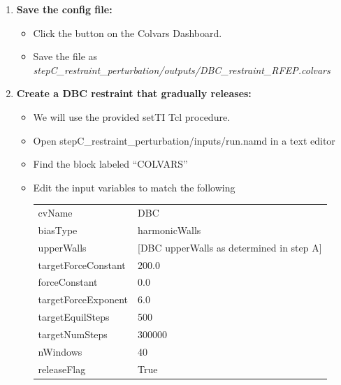 \documentclass[9pt,tutorial,pubversion]{Styling/livecoms}
\newcommand{\filepath}[1]{\textit{#1}}
\newcommand{\button}[1]{\inlineBox[gray]{\texttt{#1}}}
\begin{document}
\begin{enumerate}
\begin{enumerate}[label=\alph*., ref=\theenumi.\alph*]
            \item \textbf{Save the config file:}
            \begin{itemize}
                \item Click the \button{Save} button on the Colvars Dashboard.
                \item Save the file as \filepath{stepC\_restraint\_perturbation/outputs/DBC\_restraint\_RFEP.colvars}
            \end{itemize}
        \item \textbf{Create a DBC restraint that gradually releases:} 
            \begin{itemize}
            \item We will use the provided setTI Tcl procedure.
            \item Open stepC\_restraint\_perturbation/inputs/run.namd in a text editor
            \item Find the block labeled ``COLVARS''
            \item Edit the input variables to match the following\\
            { \ttfamily
            \begin{tabular}{l l}
                cvName & DBC\\
                biasType & harmonicWalls\\
                upperWalls & [DBC upperWalls as determined in step A]\\
                targetForceConstant & 200.0\\
                forceConstant & 0.0\\
                targetForceExponent & 6.0\\
                targetEquilSteps & 500\\
                targetNumSteps & 300000\\
                nWindows & 40\\
                releaseFlag & True
            \end{tabular} }
            \end{itemize}
        \end{enumerate}
        

\end{enumerate}
\end{document}
